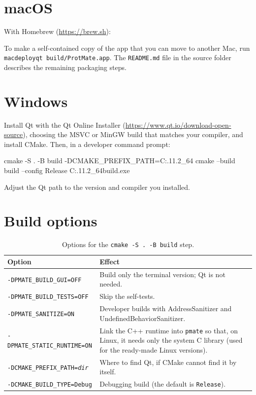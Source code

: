\documentclass[11pt,a4paper,oneside]{report}
\newcommand{\cmd}[1]{\texttt{#1}}            %
\begin{document}
\section{macOS}

With Homebrew (\url{https://brew.sh}):


To make a self-contained copy of the app that you can move to another Mac, run
\cmd{macdeployqt build/ProtMate.app}. The \cmd{README.md} file in the source folder describes the
remaining packaging steps.

\section{Windows}

Install Qt with the Qt Online Installer (\url{https://www.qt.io/download-open-source}), choosing
the MSVC or MinGW build that matches your compiler, and install CMake. Then, in a developer command
prompt:

\begin{terminal}
cmake -S . -B build -DCMAKE_PREFIX_PATH=C:\Qt\6.11.2_64
cmake --build build --config Release
C:\Qt\6.11.2_64\bin\windeployqt build\Release\ProtMate.exe
\end{terminal}

Adjust the Qt path to the version and compiler you installed.

\section{Build options}

\begin{table}[htbp]\centering\small
\caption{Options for the \cmd{cmake -S . -B build} step.}
\begin{tabularx}{\linewidth}{@{}lX@{}}
\toprule
\textbf{Option} & \textbf{Effect} \\ \midrule
\cmd{-DPMATE\_BUILD\_GUI=OFF} & Build only the terminal version; Qt is not needed. \\
\cmd{-DPMATE\_BUILD\_TESTS=OFF} & Skip the self-tests. \\
\cmd{-DPMATE\_SANITIZE=ON} & Developer builds with AddressSanitizer and UndefinedBehaviorSanitizer. \\
\cmd{-DPMATE\_STATIC\_RUNTIME=ON} & Link the C++ runtime into \cmd{pmate} so that, on Linux, it
  needs only the system C library (used for the ready-made Linux versions). \\
\cmd{-DCMAKE\_PREFIX\_PATH=\emph{dir}} & Where to find Qt, if CMake cannot find it by itself. \\
\cmd{-DCMAKE\_BUILD\_TYPE=Debug} & Debugging build (the default is \cmd{Release}). \\
\bottomrule
\end{tabularx}
\end{table}
\end{document}
